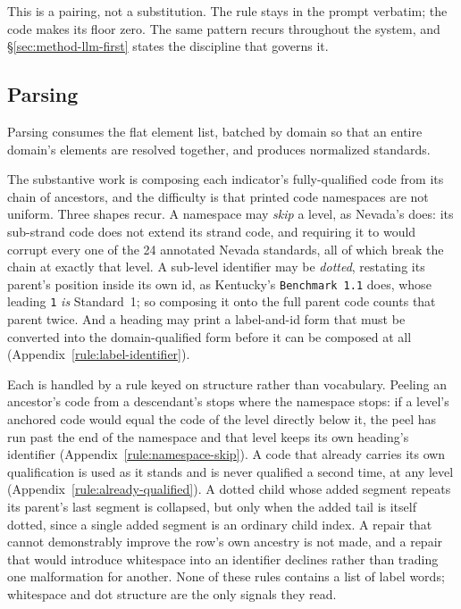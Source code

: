 This is a pairing, not a substitution. The rule stays in the prompt verbatim;
the code makes its floor zero. The same pattern recurs throughout the system,
and \S\ref{sec:method-llm-first} states the discipline that governs it.

\subsection{Parsing}
\label{sec:method-parsing}

Parsing consumes the flat element list, batched by domain so that an entire
domain's elements are resolved together, and produces normalized standards.

The substantive work is composing each indicator's fully-qualified code from its
chain of ancestors, and the difficulty is that printed code namespaces are not
uniform. Three shapes recur. A namespace may \emph{skip} a level, as Nevada's
does: its sub-strand code does not extend its strand code, and requiring it to
would corrupt every one of the 24 annotated Nevada standards, all of which break
the chain at exactly that level. A sub-level identifier may be
\emph{dotted}, restating its parent's position inside its own id, as Kentucky's
\texttt{Benchmark 1.1} does, whose leading \texttt{1} \emph{is} Standard~1; so
composing it onto the full parent code counts that parent twice. And a heading
may print a label-and-id form that must be converted into the domain-qualified
form before it can be composed at all (Appendix~\ref{rule:label-identifier}).

Each is handled by a rule keyed on structure rather than vocabulary. Peeling an
ancestor's code from a descendant's stops where the namespace stops: if a level's
anchored code would equal the code of the level directly below it, the peel has
run past the end of the namespace and that level keeps its own heading's
identifier (Appendix~\ref{rule:namespace-skip}). A code that already carries its
own qualification is used as it stands and is never qualified a second time, at
any level (Appendix~\ref{rule:already-qualified}). A dotted child whose added segment repeats its parent's last segment
is collapsed, but only when the added tail is itself dotted, since a single added
segment is an ordinary child index. A repair that cannot demonstrably improve the
row's own ancestry is not made, and a repair that would introduce whitespace into
an identifier declines rather than trading one malformation for another. None of
these rules contains a list of label words; whitespace and dot structure are the
only signals they read.

